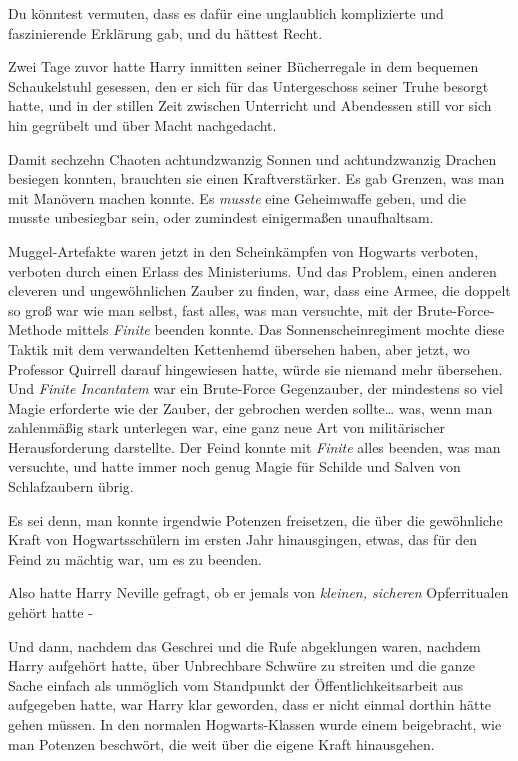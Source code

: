 {Du könntest vermuten, dass es dafür eine unglaublich komplizierte und faszinierende Erklärung gab, und du hättest Recht.

Zwei Tage zuvor hatte Harry inmitten seiner Bücherregale in dem bequemen Schaukelstuhl gesessen, den er sich für das Untergeschoss seiner Truhe besorgt hatte, und in der stillen Zeit zwischen Unterricht und Abendessen still vor sich hin gegrübelt und über Macht nachgedacht.

Damit sechzehn Chaoten achtundzwanzig Sonnen und achtundzwanzig Drachen besiegen konnten, brauchten sie einen Kraftverstärker. Es gab Grenzen, was man mit Manövern machen konnte. Es \emph{musste} eine Geheimwaffe geben, und die musste unbesiegbar sein, oder zumindest einigermaßen unaufhaltsam.

Muggel-Artefakte waren jetzt in den Scheinkämpfen von Hogwarts verboten, verboten durch einen Erlass des Ministeriums. Und das Problem, einen anderen cleveren und ungewöhnlichen Zauber zu finden, war, dass eine Armee, die doppelt so groß war wie man selbst, fast alles, was man versuchte, mit der Brute-Force-Methode mittels \emph{Finite} beenden konnte. Das Sonnenscheinregiment mochte diese Taktik mit dem verwandelten Kettenhemd übersehen haben, aber jetzt, wo Professor Quirrell darauf hingewiesen hatte, würde sie niemand mehr übersehen. Und \emph{Finite Incantatem} war ein Brute-Force Gegenzauber, der mindestens so viel Magie erforderte wie der Zauber, der gebrochen werden sollte… was, wenn man zahlenmäßig stark unterlegen war, eine ganz neue Art von militärischer Herausforderung darstellte. Der Feind konnte mit \emph{Finite} alles beenden, was man versuchte, und hatte immer noch genug Magie für Schilde und Salven von Schlafzaubern übrig.

Es sei denn, man konnte irgendwie Potenzen freisetzen, die über die gewöhnliche Kraft von Hogwartsschülern im ersten Jahr hinausgingen, etwas, das für den Feind zu mächtig war, um es zu beenden.

Also hatte Harry Neville gefragt, ob er jemals von \emph{kleinen, sicheren} Opferritualen gehört hatte -

Und dann, nachdem das Geschrei und die Rufe abgeklungen waren, nachdem Harry aufgehört hatte, über Unbrechbare Schwüre zu streiten und die ganze Sache einfach als unmöglich vom Standpunkt der Öffentlichkeitsarbeit aus aufgegeben hatte, war Harry klar geworden, dass er nicht einmal dorthin hätte gehen müssen. In den normalen Hogwarts-Klassen wurde einem beigebracht, wie man Potenzen beschwört, die weit über die eigene Kraft hinausgehen.

}
